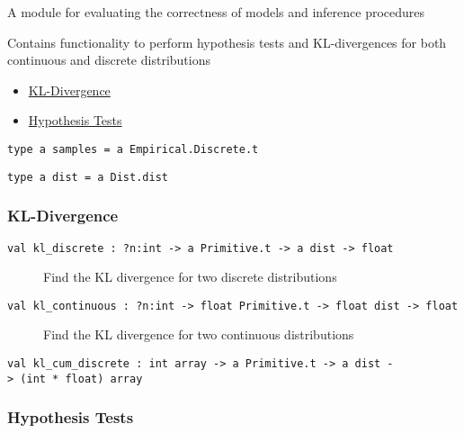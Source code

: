 A module for evaluating the correctness of models and inference
procedures

Contains functionality to perform hypothesis tests and KL-divergences
for both continuous and discrete distributions

\begin{itemize}
\tightlist
\item
  \protect\hyperlink{kl}{KL-Divergence}
\item
  \protect\hyperlink{hypux5ftests}{Hypothesis Tests}
\end{itemize}

\protect\hyperlink{type-samples}{}\texttt{type\ \textquotesingle{}a\ samples}\texttt{\ =\ \textquotesingle{}a\ Empirical.Discrete.t}

\protect\hyperlink{type-dist}{}\texttt{type\ \textquotesingle{}a\ dist}\texttt{\ =\ \textquotesingle{}a\ Dist.dist}

\hypertarget{kl}{\subsubsection{\texorpdfstring{\protect\hyperlink{kl}{}KL-Divergence}{KL-Divergence}}\label{kl}}

\begin{description}
\item[{\protect\hyperlink{val-klux5fdiscrete}{}\texttt{val\ kl\_discrete\ :\ ?⁠n:int\ -\textgreater{}\ \textquotesingle{}a\ Primitive.t\ -\textgreater{}\ \textquotesingle{}a\ dist\ -\textgreater{}\ float}}]
Find the KL divergence for two discrete distributions
\end{description}

\begin{description}
\item[{\protect\hyperlink{val-klux5fcontinuous}{}\texttt{val\ kl\_continuous\ :\ ?⁠n:int\ -\textgreater{}\ float\ Primitive.t\ -\textgreater{}\ float\ dist\ -\textgreater{}\ float}}]
Find the KL divergence for two continuous distributions
\end{description}

\protect\hyperlink{val-klux5fcumux5fdiscrete}{}\texttt{val\ kl\_cum\_discrete\ :\ int\ array\ -\textgreater{}\ \textquotesingle{}a\ Primitive.t\ -\textgreater{}\ \textquotesingle{}a\ dist\ -\textgreater{}\ (int\ *\ float)\ array}

\hypertarget{hypux5ftests}{\subsubsection{\texorpdfstring{\protect\hyperlink{hypux5ftests}{}Hypothesis
Tests}{Hypothesis Tests}}\label{hypux5ftests}}

